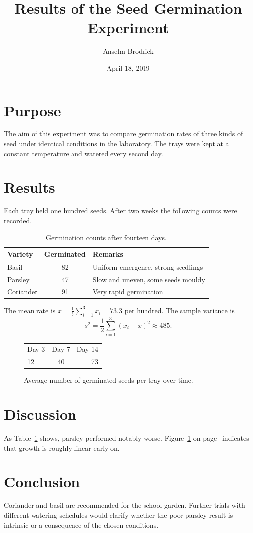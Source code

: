 \documentclass[10pt,a4paper]{article}
\title{Results of the Seed Germination Experiment}
\author{Anselm Brodrick}
\date{April 18, 2019}
\newcommand{\lab}{the laboratory}
\begin{document}
\maketitle

\section{Purpose}
The aim of this experiment was to compare germination rates of three kinds of
seed under identical conditions in \lab. The trays were kept at a constant
temperature and watered every second day.

\section{Results}
Each tray held one hundred seeds. After two weeks the following counts were
recorded.

\begin{table}[htbp]
\centering
\begin{tabular}{|l|c|p{3cm}|}
\hline
Variety & Germinated & Remarks \\
\hline
Basil & 82 & Uniform emergence, strong seedlings \\
\hline
Parsley & 47 & Slow and uneven, some seeds mouldy \\
\hline
Coriander & 91 & Very rapid germination \\
\hline
\end{tabular}
\caption{Germination counts after fourteen days.}\label{tab:germ}
\end{table}

The mean rate is $\bar{x} = \frac{1}{3}\sum_{i=1}^{3} x_i = 73.3$ per hundred.
The sample variance is
\[
s^2 = \frac{1}{2}\sum_{i=1}^{3} (x_i - \bar{x})^2 \approx 485.
\]

\begin{figure}[htbp]
\centering
\begin{tabular}{lcr}
Day 3 & Day 7 & Day 14 \\
12 & 40 & 73 \\
\end{tabular}
\caption{Average number of germinated seeds per tray over time.}
\label{fig:time}
\end{figure}

\section{Discussion}
As Table~\ref{tab:germ} shows, parsley performed notably worse. Figure~\ref{fig:time}
on page~\pageref{fig:time} indicates that growth is roughly linear early on.

\newpage
\section{Conclusion}
Coriander and basil are recommended for the school garden. Further trials
with different watering schedules would clarify whether the poor parsley
result is intrinsic or a consequence of the chosen conditions.
\end{document}
